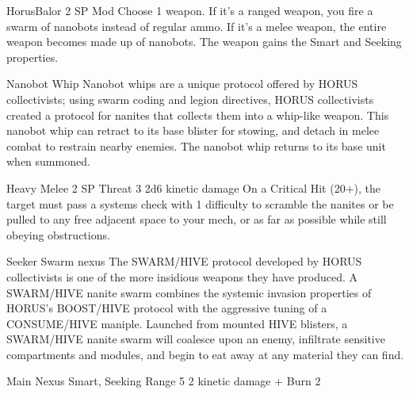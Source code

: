\begin{mech}{Horus}{Balor}
2 SP
Mod
Choose 1 weapon. If it’s a ranged weapon, you fire a swarm of nanobots instead of regular ammo. If it’s a melee weapon, the entire weapon becomes made up of nanobots. The weapon gains the Smart and Seeking properties.

Nanobot Whip
Nanobot whips are a unique protocol offered by HORUS collectivists; using swarm coding and legion directives, HORUS collectivists created a protocol for nanites that collects them into a whip-like weapon. This nanobot whip can retract to its base blister for stowing, and detach in melee combat to restrain nearby enemies. The nanobot whip returns to its base unit when summoned. 

Heavy Melee
2 SP
Threat 3
2d6 kinetic damage
On a Critical Hit (20+), the target must pass a systems check with 1 difficulty to scramble the nanites or be pulled to any free adjacent space to your mech, or as far as possible while still obeying obstructions.

Seeker Swarm nexus
The SWARM/HIVE protocol developed by HORUS collectivists is one of the more insidious weapons they have produced. A SWARM/HIVE nanite swarm combines the systemic invasion properties of HORUS’s BOOST/HIVE protocol with the aggressive tuning of a CONSUME/HIVE maniple. Launched from mounted HIVE blisters, a SWARM/HIVE nanite swarm will coalesce upon an enemy, infiltrate sensitive compartments and modules, and begin to eat away at any material they can find.

Main Nexus
Smart, Seeking
Range 5
2 kinetic damage + Burn 2


\end{mech}
